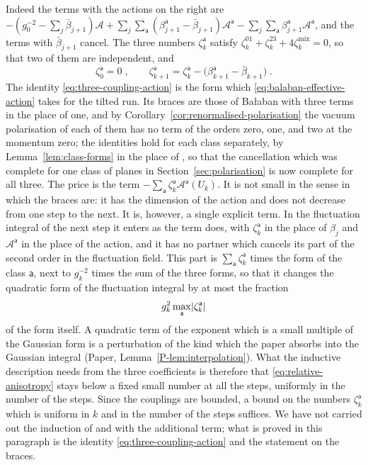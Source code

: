 \documentclass[11pt]{preprint}
\DeclarePairedDelimiter{\abs}{\lvert}{\rvert}
\numberwithin{equation}{section}
\theoremstyle{definition}
\theoremstyle{remark}
\theoremstyle{plain}
\begin{document}
Indeed the terms with the actions on the right are $-(g_0^{-2} - \sum_j\bar\beta_{j+1})\mathcal A + \sum_j\sum_{\mathsf a}(\beta^{\mathsf a}_{j+1} - \bar\beta_{j+1})\mathcal A^{\mathsf a} - \sum_j\sum_{\mathsf a}\beta^{\mathsf a}_{j+1}\mathcal A^{\mathsf a}$, and the terms with $\bar\beta_{j+1}$ cancel. The three numbers $\zeta^{\mathsf a}_k$ satisfy $\zeta^{01}_k + \zeta^{23}_k + 4\zeta^{\mathrm{mix}}_k = 0$, so that two of them are independent, and
\begin{equation}\label{eq:anisotropy-step}
    \zeta^{\mathsf a}_0 = 0\;,
    \qquad
    \zeta^{\mathsf a}_{k+1} = \zeta^{\mathsf a}_k - \bigl(\beta^{\mathsf a}_{k+1} - \bar\beta_{k+1}\bigr)\;.
\end{equation}
The identity \eqref{eq:three-coupling-action} is the form which \eqref{eq:balaban-effective-action} takes for the tilted run. Its braces are those of Ba{\l}aban with three terms in the place of one, and by Corollary~\ref{cor:renormalised-polarisation} the vacuum polarisation of each of them has no term of the orders zero, one, and two at the momentum zero; the identities \cite[(4.39)--(4.45)]{BalabanRG1} hold for each class separately, by Lemma~\ref{lem:class-forms} in the place of \cite[(4.41)]{BalabanRG1}, so that the cancellation which was complete for one class of planes in Section~\ref{sec:polarisation} is now complete for all three. The price is the term $-\sum_{\mathsf a}\zeta^{\mathsf a}_k\mathcal A^{\mathsf a}(U_k)$. It is not small in the sense in which the braces are: it has the dimension of the action and does not decrease from one step to the next. It is, however, a single explicit term. In the fluctuation integral of the next step it enters as the term \cite[(4.38)]{BalabanRG1} does, with $\zeta^{\mathsf a}_k$ in the place of $\beta_j$ and $\mathcal A^{\mathsf a}$ in the place of the action, and it has no partner which cancels its part of the second order in the fluctuation field. This part is $\sum_{\mathsf a}\zeta^{\mathsf a}_k$ times the form of the class $\mathsf a$, next to $g_k^{-2}$ times the sum of the three forms, so that it changes the quadratic form of the fluctuation integral by at most the fraction
\begin{equation}\label{eq:relative-anisotropy}
    g_k^2\max_{\mathsf a}\abs{\zeta^{\mathsf a}_k}
\end{equation}
of the form itself. A quadratic term of the exponent which is a small multiple of the Gaussian form is a perturbation of the kind which the paper absorbs into the Gaussian integral (Paper, Lemma~\ref{P-lem:interpolation}). What the inductive description needs from the three coefficients is therefore that \eqref{eq:relative-anisotropy} stays below a fixed small number at all the steps, uniformly in the number of the steps. Since the couplings are bounded, a bound on the numbers $\zeta^{\mathsf a}_k$ which is uniform in $k$ and in the number of the steps suffices. We have not carried out the induction of \cite{BalabanRG1} and \cite{BalabanCRE} with the additional term; what is proved in this paragraph is the identity \eqref{eq:three-coupling-action} and the statement on the braces.
\end{document}
